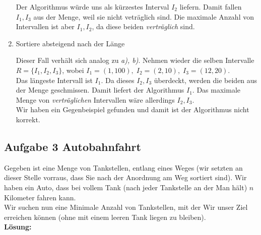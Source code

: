 \documentclass[11pt,a4paper,ngerman]{article}
\begin{document}
\begin{enumerate}[\bfseries (a)]
Der Algorithmus würde uns als kürzestes Interval $I_2$ liefern. Damit fallen $I_1, I_3$ aus der Menge, weil sie nicht veträglich sind. Die maximale Anzahl von Intervallen ist aber $I_1, I_2$, da diese beiden \emph{verträglich} sind.


\item Sortiere absteigend nach der Länge

Dieser Fall verhält sich analog zu \emph{a), b)}. Nehmen wieder die selben Intervalle $R = \{ I_1, I_2, I_3 \}$, wobei $I_1 = (1, 100), \; I_2 = (2, 10), \; I_3 = (12 , 20)$.\\

Das längeste Intervall ist $I_1$. Da dieses $I_2, I_3$ überdeckt, werden die beiden aus der Menge geschmissen. Damit liefert der Algorithmus $I_1$. Das maximale Menge von \emph{verträglichen} Intervallen wäre allerdings $I_2, I_3$.\\

Wir haben ein Gegenbeispiel gefunden und damit ist der Algorithmus nicht korrekt.

\end{enumerate}


\subsection*{Aufgabe 3 \mdseries Autobahnfahrt}

Gegeben ist eine Menge von Tankstellen, entlang eines Weges (wir setzten an dieser Stelle vorraus, dass Sie nach der Anordnung am Weg sortiert sind). Wir haben ein Auto, dass bei vollem Tank (nach jeder Tankstelle an der Man hält) $n$ Kilometer fahren kann.\\
Wir suchen nun eine Minimale Anzahl von Tankstellen, mit der Wir unser Ziel erreichen können (ohne mit einem leeren Tank liegen zu bleiben).\\

\textbf{Lösung:}\\

\label{LastPage}
\end{document}
